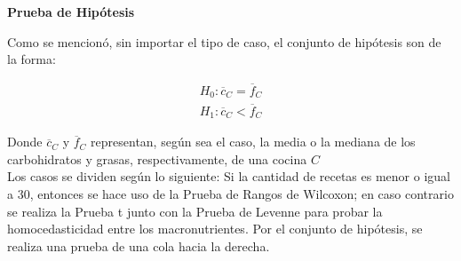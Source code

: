 \documentclass[12pt,a4paper]{article}
\begin{document}
        \textbf{Prueba de Hipótesis}\\
        {
            Como se mencionó, sin importar el tipo de caso, el conjunto de hipótesis 
            son de la forma:
            
            \begin{align*}
                H_0 : \overline{c}_C = \overline{f}_C \\
                H_1 : \overline{c}_C < \overline{f}_C
            \end{align*}

            Donde $\overline{c}_C$ y $\overline{f}_C$ representan, según sea el caso, 
            la media o la mediana de los carbohidratos y grasas, respectivamente, de 
            una cocina $C$\\

            Los casos se dividen según lo siguiente: Si la cantidad de recetas es menor 
            o igual a $30$, entonces se hace uso de la Prueba de Rangos de Wilcoxon; en 
            caso contrario se realiza la Prueba t junto con la Prueba de Levenne para 
            probar la homocedasticidad entre los macronutrientes. Por el conjunto de hipótesis, 
            se realiza una prueba de una cola hacia la derecha.\\
        }
\end{document}
